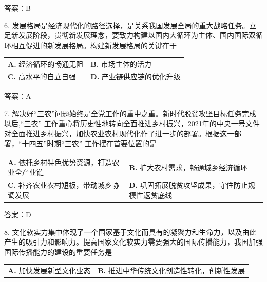 \documentclass[UTF8,11pt]{ctexart}
\begin{document}
答案：B


6. 发展格局是经济现代化的路径选择，是关系我国发展全局的重大战略任务。立足新发展阶段，贯彻新发展理念，要致力构建以国内大循环为主体、国内国际双循环相互促进的新发展格局。构建新发展格局的关键在于


\begin{center}\begin{tabular}{>{\raggedright\arraybackslash}p{\dimexpr(\linewidth-4\tabcolsep)/2\relax}>{\raggedright\arraybackslash}p{\dimexpr(\linewidth-4\tabcolsep)/2\relax}}
\textbf{A.} 经济循环的畅通无阻 & \textbf{B.} 市场主体的活力\\[.35em]
\textbf{C.} 高水平的自立自强 & \textbf{D.} 产业链供应链的优化升级\\[.35em]\end{tabular}\end{center}

答案：A


7. 解决好“三农”问题始终是全党工作的重中之重。新时代脱贫攻坚目标任务完成以后,“三农” 工作重心将历史性地转向全面推进乡村振兴，2021年的中央一号文件对全面推进乡村振兴，加快农业农村现代化作了进一步的部署。根据这一部署，“十四五”时期“三农” 工作摆在首要位置的是


\begin{center}\begin{tabular}{>{\raggedright\arraybackslash}p{\dimexpr(\linewidth-4\tabcolsep)/2\relax}>{\raggedright\arraybackslash}p{\dimexpr(\linewidth-4\tabcolsep)/2\relax}}
\textbf{A.} 依托乡村特色优势资源，打造农业全产业链 & \textbf{B.} 扩大农村需求，畅通城乡经济循环\\[.35em]
\textbf{C.} 补齐农业农村短板，带动城乡协调发展 & \textbf{D.} 巩固拓展脱贫攻坚成果，守住防止规模性返贫底线\\[.35em]\end{tabular}\end{center}

答案：D


8. 文化软实力集中体现了一个国家基于文化而具有的凝聚力和生命力，以及由此产生的吸引力和影响力。提高国家文化软实力需要强大的国际传播能力，我国加强国际传播能力的建设的重要任务是


\begin{center}\begin{tabular}{>{\raggedright\arraybackslash}p{\dimexpr(\linewidth-4\tabcolsep)/2\relax}>{\raggedright\arraybackslash}p{\dimexpr(\linewidth-4\tabcolsep)/2\relax}}
\textbf{A.} 加快发展新型文化业态 & \textbf{B.} 推进中华传统文化创造性转化，创新性发展\\[.35em]\end{tabular}\end{center}
\end{document}
